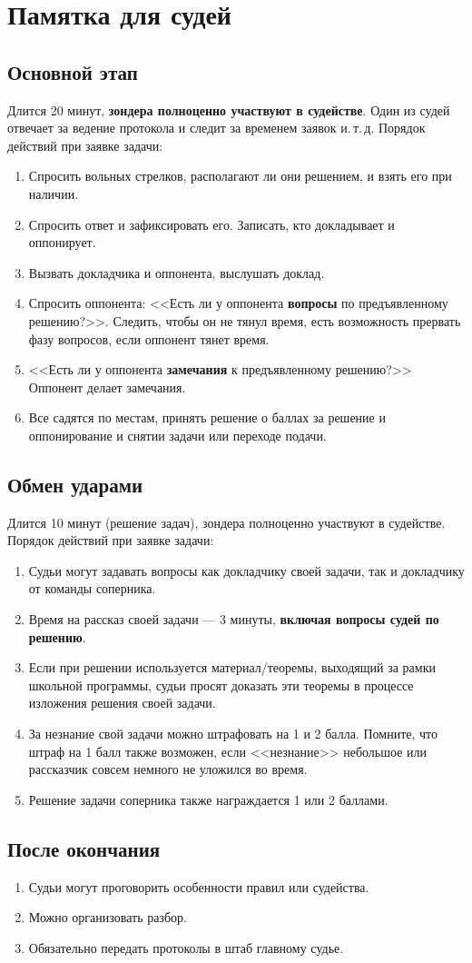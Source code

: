 \documentclass[12pt]{article}
\begin{document}
\section*{Памятка для судей}
\subsection*{Основной этап}
Длится 20 минут, {\bf зондера полноценно участвуют в судействе}. Один из судей отвечает за ведение протокола и следит за временем заявок и.\,т.\,д.
Порядок действий при заявке задачи:
\begin{enumerate}
	\item Спросить вольных стрелков, располагают ли они решением, и взять его при наличии.
	\item Спросить ответ и зафиксировать его. Записать, кто докладывает и оппонирует.
	\item Вызвать докладчика и оппонента, выслушать доклад.
	\item Спросить оппонента: <<Есть ли у оппонента {\bf вопросы} по предъявленному решению?>>. Следить, чтобы он не тянул время, есть возможность прервать фазу вопросов, если оппонент тянет время.
	\item <<Есть ли у оппонента {\bf замечания} к предъявленному решению?>> Оппонент делает замечания.
	\item Все садятся по местам, принять решение о баллах за решение и оппонирование и снятии задачи или переходе подачи.
\end{enumerate}

\subsection*{Обмен ударами}
Длится 10 минут (решение задач), зондера полноценно участвуют в судействе.
Порядок действий при заявке задачи:
\begin{enumerate}
	\item Судьи могут задавать вопросы как докладчику своей задачи, так и докладчику от команды соперника.
	\item Время на рассказ своей задачи --- 3 минуты, {\bf включая вопросы судей по решению}.
	\item Если при решении используется материал/теоремы, выходящий за рамки школьной программы, судьи просят доказать эти теоремы в процессе изложения решения своей задачи. 
	\item За незнание свой задачи можно штрафовать на 1 и 2 балла. Помните, что штраф на 1 балл также возможен, если <<незнание>> небольшое или рассказчик совсем немного не уложился во время.
	\item Решение задачи соперника также награждается 1 или 2 баллами.
\end{enumerate}

\subsection*{После окончания}
\begin{enumerate}
	\item Судьи могут проговорить особенности правил или судейства.
	\item Можно организовать разбор.
	\item Обязательно передать протоколы в штаб главному судье.
\end{enumerate}
\end{document}
